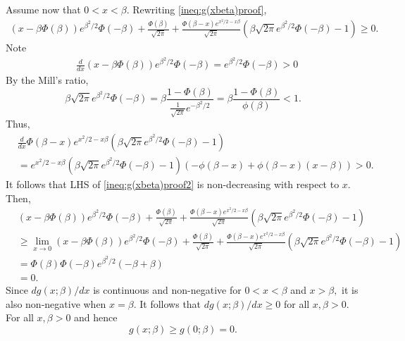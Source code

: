 \documentclass[fleqn,mnsc,nonblindrev]{informs4}
\begin{document}
Assume now that $0<x<\beta$. Rewriting \eqref{ineq:g(xbeta)proof},
\begin{align}
(x-\beta\Phi(\beta))e^{\beta^2/2}\Phi(-\beta)+\frac{\Phi(\beta)}{\sqrt{2\pi}}+\frac{\Phi(\beta-x)e^{x^2/2-x\beta}}{\sqrt{2\pi}}(\beta\sqrt{2\pi} e^{\beta^2/2}\Phi(-\beta)-1)\geq 0.\label{ineq:g(xbeta)proof2}
\end{align}
Note
\begin{align*}
&\frac{d}{dx}(x-\beta\Phi(\beta))e^{\beta^2/2}\Phi(-\beta)=e^{\beta^2/2}\Phi(-\beta)>0
\end{align*}
By the Mill's ratio,
\[
\beta\sqrt{2\pi} e^{\beta^2/2}\Phi(-\beta)=\beta\frac{1-\Phi(\beta)}{\frac{1}{\sqrt{2\pi}} e^{-\beta^2/2}}=\beta\frac{1-\Phi(\beta)}{\phi(\beta)}<1.
\]
Thus,
\begin{align*}
&\frac{d}{dx}\Phi(\beta-x)e^{x^2/2-x\beta}(\beta\sqrt{2\pi} e^{\beta^2/2}\Phi(-\beta)-1)\\
&=e^{x^2/2-x\beta}(\beta\sqrt{2\pi} e^{\beta^2/2}\Phi(-\beta)-1)(-\phi(\beta-x)+\phi(\beta-x)(x-\beta))>0.
\end{align*}
It follows that LHS of \eqref{ineq:g(xbeta)proof2} is non-decreasing with respect to $x.$ Then,
\begin{align*}
&(x-\beta\Phi(\beta))e^{\beta^2/2}\Phi(-\beta)+\frac{\Phi(\beta)}{\sqrt{2\pi}}+\frac{\Phi(\beta-x)e^{x^2/2-x\beta}}{\sqrt{2\pi}}(\beta\sqrt{2\pi} e^{\beta^2/2}\Phi(-\beta)-1)\\
&\geq \lim_{x\to0}(x-\beta\Phi(\beta))e^{\beta^2/2}\Phi(-\beta)+\frac{\Phi(\beta)}{\sqrt{2\pi}}+\frac{\Phi(\beta-x)e^{x^2/2-x\beta}}{\sqrt{2\pi}}(\beta\sqrt{2\pi} e^{\beta^2/2}\Phi(-\beta)-1)\\
&=\Phi(\beta)\Phi(-\beta)e^{\beta^2/2}\left(-\beta +\beta \right)\\
&=0.
\end{align*}
Since $dg(x;\beta)/dx$ is continuous and non-negative for $0<x<\beta$ and $x>\beta,$ it is also non-negative when $x=\beta.$ It follows that $dg(x;\beta)/dx\geq 0$ for all $x,\beta>0$. For all $x,\beta>0$ and hence 
\[
g(x;\beta)\geq g(0;\beta)=0.
\]

\end{document}
